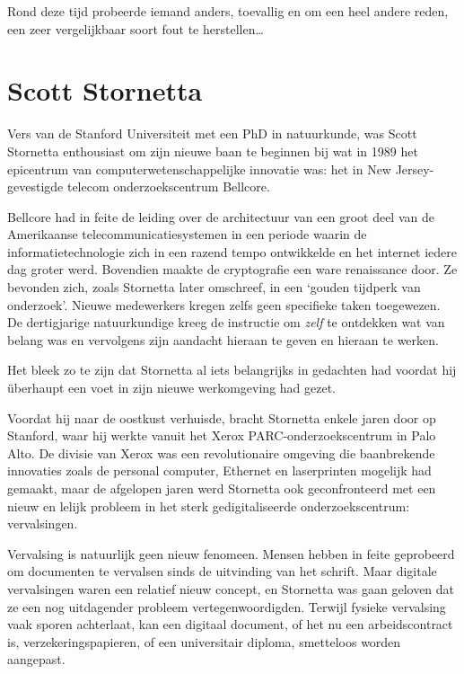 \documentclass[
  a5paper,
  smalldemyvopaper,11pt,twoside,onecolumn,openright,extrafontsizes,
hidelinks]{memoir}
\begin{document}
Rond deze tijd probeerde iemand anders, toevallig en om een heel andere
reden, een zeer vergelijkbaar soort fout te herstellen\ldots{}

\section{Scott Stornetta}\label{scott-stornetta}

Vers van de Stanford Universiteit met een PhD in natuurkunde, was Scott
Stornetta enthousiast om zijn nieuwe baan te beginnen bij wat in 1989
het epicentrum van computerwetenschappelijke innovatie was: het in New
Jersey-gevestigde telecom onderzoekscentrum Bellcore.

Bellcore had in feite de leiding over de architectuur van een groot deel
van de Amerikaanse telecommunicatiesystemen in een periode waarin de
informatietechnologie zich in een razend tempo ontwikkelde en het
internet iedere dag groter werd. Bovendien maakte de cryptografie een
ware renaissance door. Ze bevonden zich, zoals Stornetta later
omschreef, in een `gouden tijdperk van onderzoek'. Nieuwe medewerkers
kregen zelfs geen specifieke taken toegewezen. De dertigjarige
natuurkundige kreeg de instructie om \emph{zelf} te ontdekken wat van
belang was en vervolgens zijn aandacht hieraan te geven en hieraan te
werken.

Het bleek zo te zijn dat Stornetta al iets belangrijks in gedachten had
voordat hij überhaupt een voet in zijn nieuwe werkomgeving had gezet.

Voordat hij naar de oostkust verhuisde, bracht Stornetta enkele jaren
door op Stanford, waar hij werkte vanuit het Xerox
PARC-onderzoekscentrum in Palo Alto. De divisie van Xerox was een
revolutionaire omgeving die baanbrekende innovaties zoals de personal
computer, Ethernet en laserprinten mogelijk had gemaakt, maar de
afgelopen jaren werd Stornetta ook geconfronteerd met een nieuw en
lelijk probleem in het sterk gedigitaliseerde onderzoekscentrum:
vervalsingen.

Vervalsing is natuurlijk geen nieuw fenomeen. Mensen hebben in feite
geprobeerd om documenten te vervalsen sinds de uitvinding van het
schrift. Maar digitale vervalsingen waren een relatief nieuw concept, en
Stornetta was gaan geloven dat ze een nog uitdagender probleem
vertegenwoordigden. Terwijl fysieke vervalsing vaak sporen achterlaat,
kan een digitaal document, of het nu een arbeidscontract is,
verzekeringspapieren, of een universitair diploma, smetteloos worden
aangepast.
\end{document}
